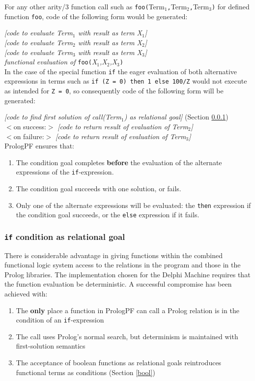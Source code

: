 For any other arity/3 function call such as
\mbox{\texttt{foo(}Term$_1$\texttt{,}Term$_2$\texttt{,}Term$_3$\texttt{)}}
for defined function \texttt{foo}, code
of the following form would be generated:

\textit{[code to evaluate Term$_1$ with result as term X$_1$]} \\[1mm]
\textit{[code to evaluate Term$_2$ with result as term X$_2$]} \\[1mm]
\textit{[code to evaluate Term$_3$ with result as term X$_3$]} \\[1mm]
\textit{functional evaluation of} \texttt{foo(}\textit{X$_1$,X$_2$,X$_3$}\texttt{)}\\

In the case of the special function \texttt{if} the eager evaluation of both
alternative expressions in terms such as 
\texttt{if (Z = 0) then 1 else 100/Z} would
not execute as intended for \texttt{Z = 0}, so consequently
code of the following form will be generated:

\textit{[code to find first solution of call(Term$_1$) 
   as relational goal]} (Section \ref{if:cond}) \\[1mm]
$<$on success:$>$ \textit{[code to return result of evaluation of Term$_2$]} \\[1mm]
$<$on failure:$>$ \textit{[code to return result of evaluation of Term$_3$]} \\


PrologPF ensures that:
\begin{enumerate}
\item{The condition goal completes \textbf{before} the evaluation of the
  alternate expressions of the \texttt{if}-expression.}
\item{The condition goal succeeds with one solution, or fails.}
\item{Only one of the alternate expressions will be evaluated: the \texttt{then}
  expression if the condition goal succeeds, or the \texttt{else} expression
  if it fails.}
\end{enumerate}

\subsubsection{\texttt{if} condition as relational goal}
\label{if:cond}

There is considerable advantage in giving functions within the combined
functional logic system access to the relations in the program and those in
the Prolog libraries.  The implementation chosen for the Delphi Machine
requires that the function evaluation be deterministic.  A successful
compromise has been achieved with:
\begin{enumerate}
\item{The \textbf{only} place a function in PrologPF can call a Prolog
  relation is in the condition of an \texttt{if}-expression}
\item{The call uses Prolog's normal search, but determinism is maintained with
  first-solution semantics}
\item{The acceptance of boolean functions as relational goals reintroduces
  functional terms as conditions (Section \ref{bool})}
\end{enumerate}

